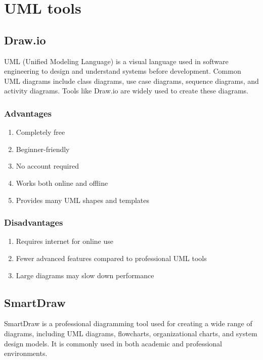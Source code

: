 \chapter{UML tools} \label{ch:procedure}


\section{Draw.io}




UML (Unified Modeling Language) is a visual language used in software engineering to design and understand systems before development. Common UML diagrams include class diagrams, use case diagrams, sequence diagrams, and activity diagrams. Tools like Draw.io are widely used to create these diagrams.
\subsection{Advantages}
\begin{enumerate}
    \item Completely free
    \item Beginner-friendly
    \item No account required
    \item Works both online and offline
    \item Provides many UML shapes and templates
\end{enumerate}

\subsection{Disadvantages}
\begin{enumerate}
    \item Requires internet for online use
    \item Fewer advanced features compared to professional UML tools
    \item Large diagrams may slow down performance
\end{enumerate}

\section{SmartDraw}

SmartDraw is a professional diagramming tool used for creating a wide range of diagrams, including UML diagrams, flowcharts, organizational charts, and system design models. It is commonly used in both academic and professional environments.

